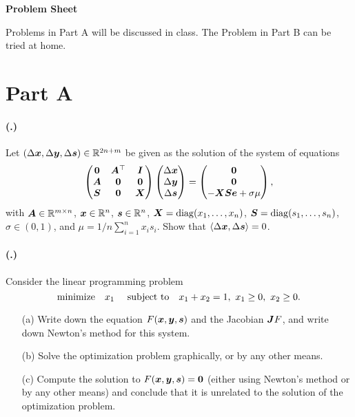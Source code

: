 \documentclass{article}
\newcounter{problemSheetNumber}
\newcounter{problems}
\renewcommand{\problem}{\paragraph{(\theproblemSheetNumber.\theproblems)}\addtocounter{problems}{1}}
\begin{document}
 
\begin{center}
{\Large {\bf Problem Sheet \theproblemSheetNumber}}
\end{center}

Problems in Part A will be discussed in class. The Problem in Part B can be tried at home.


\section*{Part A}

\problem Let $(\Delta \bm{x},\Delta \bm{y},\Delta \bm{s})\in \mathbb{R}^{2n+m}$ be given as the solution 
of the system of equations
\begin{equation*}
 \begin{pmatrix}
  \bm{0} & \bm{A}^{\top} & \bm{I} \\
  \bm{A} & \bm{0} & \bm{0} \\
  \bm{S} & \bm{0} & \bm{X}
 \end{pmatrix}
\begin{pmatrix} \Delta\bm{x}\\ \Delta \bm{y}\\ \Delta\bm{s} \end{pmatrix} = \begin{pmatrix} \bm{0} \\ \bm{0} \\ -\bm{X}\bm{S}\bm{e}+\sigma \mu\end{pmatrix},
\end{equation*}
with $\bm{A}\in \mathbb{R}^{m\times n}$, $\bm{x}\in \mathbb{R}^n$, $\bm{s}\in \mathbb{R}^n$, $\bm{X}=\mathrm{diag}(x_1,\dots,x_n)$, $\bm{S}=\mathrm{diag}(s_1,\dots,s_n)$, $\sigma\in (0,1)$, and $\mu=1/n \sum_{i=1}^n x_is_i$.
Show that $\langle {\Delta\bm{x}}, {\Delta\bm{s}} \rangle=0$.

\problem Consider the linear programming problem
\begin{equation*}
 \minimize x_1 \ \subjto x_1+x_2=1, \ x_1\geq 0, \ x_2\geq 0.
\end{equation*}
\begin{itemize}
 \item[(a)] Write down the equation $F(\bm{x},\bm{y},\bm{s})$ and the Jacobian $\bm{J}F$, and write down Newton's method for this system.
 \item[(b)] Solve the optimization problem graphically, or by any other means.
 \item[(c)] Compute the solution to $F(\bm{x},\bm{y},\bm{s})=\bm{0}$ (either using Newton's method or by any other means) and conclude that it is unrelated to the solution of the optimization problem.
\end{itemize}
\end{document}
